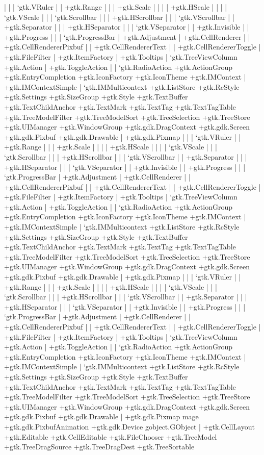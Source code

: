 | | | ‘gtk.VRuler
| | +gtk.Range
| | | +gtk.Scale
| | | | +gtk.HScale
| | | | ‘gtk.VScale
| | | ‘gtk.Scrollbar
| | | +gtk.HScrollbar
| | | ‘gtk.VScrollbar
| | +gtk.Separator
| | | +gtk.HSeparator
| | | ‘gtk.VSeparator
| | +gtk.Invisible
| | +gtk.Progress
| | | ‘gtk.ProgressBar
| +gtk.Adjustment
| +gtk.CellRenderer
| | +gtk.CellRendererPixbuf
| | +gtk.CellRendererText
| | +gtk.CellRendererToggle
| +gtk.FileFilter
| +gtk.ItemFactory
| +gtk.Tooltips
| ‘gtk.TreeViewColumn
+gtk.Action
| +gtk.ToggleAction
| | ‘gtk.RadioAction
+gtk.ActionGroup
+gtk.EntryCompletion
+gtk.IconFactory
+gtk.IconTheme
+gtk.IMContext
| +gtk.IMContextSimple
| ‘gtk.IMMulticontext
+gtk.ListStore
+gtk.RcStyle
+gtk.Settings
+gtk.SizeGroup
+gtk.Style
+gtk.TextBuffer
+gtk.TextChildAnchor
+gtk.TextMark
+gtk.TextTag
+gtk.TextTagTable
+gtk.TreeModelFilter
+gtk.TreeModelSort
+gtk.TreeSelection
+gtk.TreeStore
+gtk.UIManager
+gtk.WindowGroup
+gtk.gdk.DragContext
+gtk.gdk.Screen
+gtk.gdk.Pixbuf
+gtk.gdk.Drawable
| +gtk.gdk.Pixmap
| | | ‘gtk.VRuler
| | +gtk.Range
| | | +gtk.Scale
| | | | +gtk.HScale
| | | | ‘gtk.VScale
| | | ‘gtk.Scrollbar
| | | +gtk.HScrollbar
| | | ‘gtk.VScrollbar
| | +gtk.Separator
| | | +gtk.HSeparator
| | | ‘gtk.VSeparator
| | +gtk.Invisible
| | +gtk.Progress
| | | ‘gtk.ProgressBar
| +gtk.Adjustment
| +gtk.CellRenderer
| | +gtk.CellRendererPixbuf
| | +gtk.CellRendererText
| | +gtk.CellRendererToggle
| +gtk.FileFilter
| +gtk.ItemFactory
| +gtk.Tooltips
| ‘gtk.TreeViewColumn
+gtk.Action
| +gtk.ToggleAction
| | ‘gtk.RadioAction
+gtk.ActionGroup
+gtk.EntryCompletion
+gtk.IconFactory
+gtk.IconTheme
+gtk.IMContext
| +gtk.IMContextSimple
| ‘gtk.IMMulticontext
+gtk.ListStore
+gtk.RcStyle
+gtk.Settings
+gtk.SizeGroup
+gtk.Style
+gtk.TextBuffer
+gtk.TextChildAnchor
+gtk.TextMark
+gtk.TextTag
+gtk.TextTagTable
+gtk.TreeModelFilter
+gtk.TreeModelSort
+gtk.TreeSelection
+gtk.TreeStore
+gtk.UIManager
+gtk.WindowGroup
+gtk.gdk.DragContext
+gtk.gdk.Screen
+gtk.gdk.Pixbuf
+gtk.gdk.Drawable
| +gtk.gdk.Pixmap
| | | ‘gtk.VRuler
| | +gtk.Range
| | | +gtk.Scale
| | | | +gtk.HScale
| | | | ‘gtk.VScale
| | | ‘gtk.Scrollbar
| | | +gtk.HScrollbar
| | | ‘gtk.VScrollbar
| | +gtk.Separator
| | | +gtk.HSeparator
| | | ‘gtk.VSeparator
| | +gtk.Invisible
| | +gtk.Progress
| | | ‘gtk.ProgressBar
| +gtk.Adjustment
| +gtk.CellRenderer
| | +gtk.CellRendererPixbuf
| | +gtk.CellRendererText
| | +gtk.CellRendererToggle
| +gtk.FileFilter
| +gtk.ItemFactory
| +gtk.Tooltips
| ‘gtk.TreeViewColumn
+gtk.Action
| +gtk.ToggleAction
| | ‘gtk.RadioAction
+gtk.ActionGroup
+gtk.EntryCompletion
+gtk.IconFactory
+gtk.IconTheme
+gtk.IMContext
| +gtk.IMContextSimple
| ‘gtk.IMMulticontext
+gtk.ListStore
+gtk.RcStyle
+gtk.Settings
+gtk.SizeGroup
+gtk.Style
+gtk.TextBuffer
+gtk.TextChildAnchor
+gtk.TextMark
+gtk.TextTag
+gtk.TextTagTable
+gtk.TreeModelFilter
+gtk.TreeModelSort
+gtk.TreeSelection
+gtk.TreeStore
+gtk.UIManager
+gtk.WindowGroup
+gtk.gdk.DragContext
+gtk.gdk.Screen
+gtk.gdk.Pixbuf
+gtk.gdk.Drawable
| +gtk.gdk.Pixmap
mage
+gtk.gdk.PixbufAnimation
+gtk.gdk.Device
gobject.GObject
|
+gtk.CellLayout
+gtk.Editable
+gtk.CellEditable
+gtk.FileChooser
+gtk.TreeModel
+gtk.TreeDragSource
+gtk.TreeDragDest
+gtk.TreeSortable

